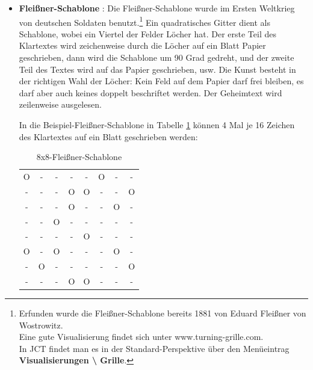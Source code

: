 \begin{refsegment}
\begin{itemize}
   \hypertarget{turning-grille-cipher}{}   %
\item \textbf{Fleißner-Schablone} \cite{Savard1999}%
   :
   Die Fleißner-Schablone wurde im Ersten Weltkrieg von deutschen Soldaten
   benutzt.\footnote{%
      Erfunden wurde die Fleißner-Schablone bereits 1881 von Eduard Fleißner
      von Wostrowitz.\\
      Eine gute Visualisierung findet sich unter www.turning-grille.com.\\
      In JCT findet man es in der Standard-Perspektive
      über den Menüeintrag \textbf{Visualisierungen \textbackslash{} Grille}.
   }
   Ein quadratisches Gitter dient als Schablone, wobei ein Viertel der
   Felder Löcher hat. Der erste Teil des Klartextes wird zeichenweise
   durch die Löcher auf ein Blatt Papier geschrieben, dann wird die
   Schablone um 90 Grad gedreht, und der zweite Teil des Textes wird
   auf das Papier geschrieben, usw. Die Kunst besteht in der richtigen
   Wahl der Löcher: Kein Feld auf dem Papier darf frei bleiben, es
   darf aber auch keines doppelt beschriftet werden. Der Geheimtext
   wird zeilenweise ausgelesen.

   In die Beispiel-Fleißner-Schablone in Tabelle \ref{PaP_88Fleissner_table-reference}
   können 4 Mal je 16 Zeichen des Klartextes auf ein Blatt geschrieben werden:
   \begin{table}[ht]
   \begin{center}
   \begin{tabular}{|cccc|cccc|}
   \hline 	
	O & - & - & - & - & O & - & - \\
	- & - & - & O & O & - & - & O \\
	- & - & - & O & - & - & O & - \\
	- & - & O & - & - & - & - & - \\
   \hline 	
	- & - & - & - & O & - & - & - \\
	O & - & O & - & - & - & O & - \\
	- & O & - & - & - & - & - & O \\
	- & - & - & O & O & - & - & - \\
   \hline
   \end{tabular}
   \caption{8x8-Fleißner-Schablone}
   \label{PaP_88Fleissner_table-reference}
   \end{center}
   \end{table}

\end{itemize}



\end{refsegment}

